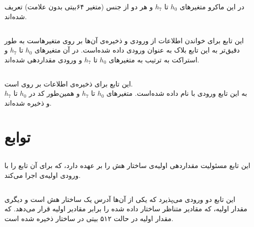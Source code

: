 در این ماکرو متغیرهای ‌$ h_0 $ تا $ h_7 $ و  هر دو از جنس (متغیر ۶۴بیتی بدون علامت) تعریف شده‌اند. 


\subsection{} 
\label{subsec:READ-STATE-BIG}


این تابع برای خواندن اطلاعات از ورودی و ذخیره‌ی ‌‌آن‌ها بر روی متغیرهاست به طور دقیق‌تر  به این تابع ‌بلاک  به عنوان ورودی داده شده‌است. در آن متغیرهای $ h_0 $ تا $ h_7 $ و  استراکت به ترتیب به متغیرهای ‌$ h_0 $ تا $ h_7 $ و  ورودی مقداردهی شده‌اند.

\subsection{} 
\label{subsec:WRITE-STATE-BIG}


این تابع برای ذخیره‌ی اطلاعات بر روی  است.\\
به این تابع ورودی   با نام  داده شده‌است. متغیرهای $ h_0 $ تا $ h_7 $ و همین‌طور  کد در $ h_0 $  تا  $ h_ 7 $ و   
 ذخیره شده‌اند.

\section{ توابع}

\subsection{}
\label{subsec:sph-skein512-init}
این تابع مسئولیت مقداردهی اولیه‌ی ساختار هش را بر عهده دارد، که برای آن تابع \hyperref[subsec:skein-big-init]{} را با ورودی‌ اولیه‌ی  اجرا می‌کند.
\subsection{}
\label{subsec:skein-big-init}

این تابع دو ورودی می‌پذیرد که یکی از آن‌ها آدرس یک ساختار هش است و دیگری مقدار اولیه، که مقادیر متناظر ساختار داده شده را برابر مقادیر اولیه قرار می‌دهد.
که مقدار اولیه در حالت ۵۱۲ بیتی در ساختار  ذخیره شده ‌است.

\subsection{}
\label{subsec:sph-skein512}

